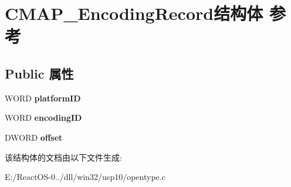\hypertarget{struct_c_m_a_p___encoding_record}{}\section{C\+M\+A\+P\+\_\+\+Encoding\+Record结构体 参考}
\label{struct_c_m_a_p___encoding_record}
\subsection*{Public 属性}
\begin{DoxyCompactItemize}
\item 
\mbox{\label{struct_c_m_a_p___encoding_record_a0f2535b6745cea3adaa31b59ddb99549}} 
W\+O\+RD {\bfseries platform\+ID}
\item 
\mbox{\label{struct_c_m_a_p___encoding_record_a5f40f80fc979efdf6aa0f407b7f867fa}} 
W\+O\+RD {\bfseries encoding\+ID}
\item 
\mbox{\label{struct_c_m_a_p___encoding_record_ad82a4509603604775693e606cef1a9c8}} 
D\+W\+O\+RD {\bfseries offset}
\end{DoxyCompactItemize}


该结构体的文档由以下文件生成\+:\begin{DoxyCompactItemize}
\item 
E\+:/\+React\+O\+S-\/0../dll/win32/usp10/opentype.\+c\end{DoxyCompactItemize}
